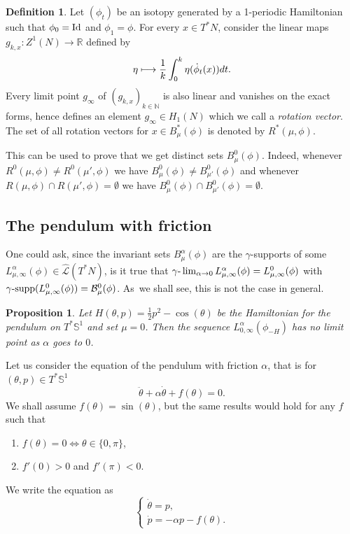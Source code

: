 \documentclass[10pt]{amsart}
\newcommand\mto{\mathchoice{\longmapsto}{\mapsto}{\mapsto}{\mapsto}}
\newtheorem{prop}[thm]{Proposition}
\theoremstyle{definition}
\newtheorem{defn}[thm]{Definition}
\newcommand{\B}{{\mathcal B}}
\newcommand{\N}{\mathbb{N}}
\newcommand{\R}{\mathbb{R}}
\newcommand{\bS}{\mathbb{S}}
\DeclareMathOperator{\gammasupp}{\gamma\textup{-supp}}
\begin{document}
\begin{defn} Let $(\phi_t)$ be an isotopy generated by a 1-periodic Hamiltonian such that $\phi_0={\rm Id}$ and $\phi_1=\phi$. For every $x\in T^*N$, consider the linear maps $g_{k, x}:Z^1(N)\to \R$ defined by
\[
\eta\mto\frac{1}{k}\int_0^k\eta(\dot \phi_t(x))dt.
\]
Every limit point $g_\infty$ of $(g_{k, x})_{k\in\N}$ is also linear and vanishes on the exact forms, hence defines an element $g_\infty\in H_1(N)$ which we call a \emph{rotation vector}. The set of all rotation vectors for $x \in B_{\mu}^*(\phi)$ is denoted by $R^*(\mu,\phi)$.
\end{defn}
This can be used to prove that we get distinct sets $B_{\mu}^0(\phi)$. Indeed, whenever $R^0(\mu,\phi)\neq R^0(\mu',\phi)$ we have $B_{\mu}^0(\phi)\neq B_{\mu'}^0(\phi)$ and whenever
$R(\mu,\phi)\cap R(\mu',\phi)=\emptyset$ we have $B_{\mu}^0(\phi)\cap B_{\mu'}^0(\phi)=\emptyset$.

\subsection{The pendulum with friction}
One could ask, since the invariant sets $B^\alpha_{\mu}(\phi)$ are the $\gamma$\nobreakdash-supports of some $L^\alpha_{\mu,\infty}(\phi) \in \widehat{\mathcal L} (T^*N)$, is it true that $\gamma\textup{-}\lim_{\alpha\to 0} L^\alpha_{\mu,\infty}(\phi)=L^0_{\mu,\infty}(\phi)$ with $\gammasupp (L^0_{\mu,\infty}(\phi))=\B^0_{\mu}(\phi)$. As~we shall see, this is not the case in general.

\begin{prop}
Let $H(\theta,p)= \frac{1}{2}p^2-\cos(\theta)$ be the Hamiltonian for the pendulum on $T^*\bS^1$ and set $\mu=0$. Then the sequence $L^\alpha_{0,\infty}(\phi_{-H})$ has no limit point as $ \alpha$ goes to $0$.
\end{prop}

Let us consider the equation of the pendulum with friction $\alpha$, that is for $(\theta, p)\in T^*\bS^1$
\begin{equation}\label{eq:pendulum} \ddot \theta + \alpha \dot \theta + f(\theta)=0.
\end{equation}
We shall assume $f(\theta)=\sin(\theta)$, but the same results would hold for any $f$ such that
\begin{enumerate}
\item $f(\theta)=0 \Leftrightarrow \theta \in \{0,\pi\}$,
\item $f'(0)>0$ and $f'(\pi)<0$.
\end{enumerate}
We write the equation as
\begin{equation}\label{eq:pendulum2}
\begin{cases}
\dot \theta =p,\\
\dot p=- \alpha p - f(\theta).
\end{cases}
\end{equation}
\end{document}
